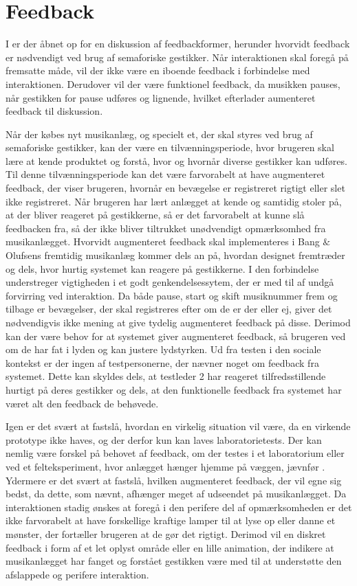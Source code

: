 \section{Feedback}
\label{DiskussionFeedback}
%
I  er der åbnet op for en diskussion af feedbackformer, herunder hvorvidt feedback er nødvendigt ved brug af semaforiske gestikker. Når interaktionen skal foregå på fremsatte måde, vil der ikke være en iboende feedback i forbindelse med interaktionen. Derudover vil der være funktionel feedback, da musikken pauses, når gestikken for pause udføres og lignende, hvilket efterlader aumenteret feedback til diskussion.

Når der købes nyt musikanlæg, og specielt et, der skal styres ved brug af semaforiske gestikker, kan der være en tilvænningsperiode, hvor brugeren skal lære at kende produktet og forstå, hvor og hvornår diverse gestikker kan udføres. Til denne tilvænningsperiode kan det være farvorabelt at have augmenteret feedback, der viser brugeren, hvornår en bevægelse er registreret rigtigt eller slet ikke registreret. Når brugeren har lært anlægget at kende og samtidig stoler på, at der bliver reageret på gestikkerne, så er det farvorabelt at kunne slå feedbacken fra, så der ikke bliver tiltrukket unødvendigt opmærksomhed fra musikanlægget.\blankline
%
Hvorvidt augmenteret feedback skal implementeres i Bang $\&$ Olufsens fremtidig musikanlæg kommer dels an på, hvordan designet fremtræder og dels, hvor hurtig systemet kan reagere på gestikkerne. I den forbindelse understreger \textcite[s. 8]{PDF:AChairAsUbiquitousInputDevice} vigtigheden i et godt genkendelsessytem, der er med til af undgå forvirring ved interaktion. Da både pause, start og skift musiknummer frem og tilbage er bevægelser, der skal registreres efter om de er der eller ej, giver det nødvendigvis ikke mening at give tydelig augmenteret feedback på disse. Derimod kan der være behov for at systemet giver augmenteret feedback, så brugeren ved om de har fat i lyden og kan justere lydstyrken. Ud fra testen i den sociale kontekst er der ingen af testpersonerne, der nævner noget om feedback fra systemet. Dette kan skyldes dels, at testleder 2 har reageret tilfredsstillende hurtigt på deres gestikker og dels, at den funktionelle feedback fra systemet har været alt den feedback de behøvede. 

Igen er det svært at fastslå, hvordan en virkelig situation vil være, da en virkende prototype ikke haves, og der derfor kun kan laves laboratorietests. Der kan nemlig være forskel på behovet af feedback, om der testes i et laboratorium eller ved et felteksperiment, hvor anlægget hænger hjemme på væggen, jævnfør . Ydermere er det svært at fastslå, hvilken augmenteret feedback, der vil egne sig bedst, da dette, som nævnt, afhænger meget af udseendet på musikanlægget. Da interaktionen stadig ønskes at foregå i den perifere del af opmærksomheden er det ikke farvorabelt at have forskellige kraftige lamper til at lyse op eller danne et mønster, der fortæller brugeren at de gør det rigtigt. Derimod vil en diskret feedback i form af et let oplyst område eller en lille animation, der indikere at musikanlægget har fanget og forstået gestikken være med til at understøtte den afslappede og perifere interaktion.
%